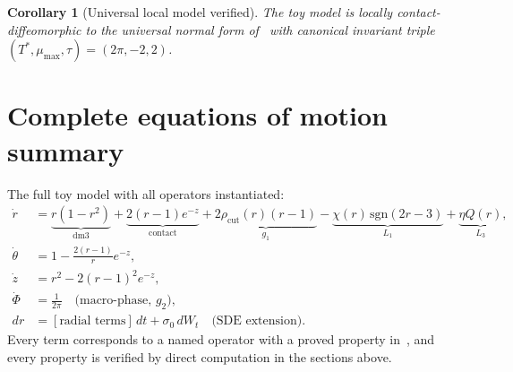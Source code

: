\documentclass[12pt, oneside]{book}
\theoremstyle{plain}
\newtheorem{corollary}[theorem]{Corollary}
\theoremstyle{definition}
\theoremstyle{remark}
\begin{document}
\begin{corollary}[Universal local model verified]\label{cor:universal}
The toy model is locally contact-diffeomorphic to the universal
normal form of~\cite{Paper1} with canonical invariant triple
$(T^*,\mu_{\max},\tau)=(2\pi,-2,2)$.
\end{corollary}

\section{Complete equations of motion summary}\label{sec:summary}

The full toy model with all operators instantiated:
\begin{align}
  \dot r &= \underbrace{r(1-r^2)}_{\text{dm3}}
           + \underbrace{2(r-1)e^{-z}}_{\text{contact}}
           + \underbrace{2\rho_{\mathrm{cut}}(r)(r-1)}_{g_1}
           - \underbrace{\chi(r)\,\mathrm{sgn}(2r-3)}_{L_1}
           + \underbrace{\eta Q(r)}_{L_3},\\
  \dot\theta &= 1 - \frac{2(r-1)}{r}e^{-z},\\
  \dot z &= r^2 - 2(r-1)^2 e^{-z},\\
  \dot\Phi &= \frac{1}{2\pi}\quad\text{(macro-phase, }g_2\text{)},\\
  dr &= [\text{radial terms}]\,dt + \sigma_0\,dW_t\quad
       \text{(SDE extension)}.
\end{align}
Every term corresponds to a named operator with a proved property
in~\cite{Paper1}, and every property is verified by direct computation
in the sections above.
\end{document}
